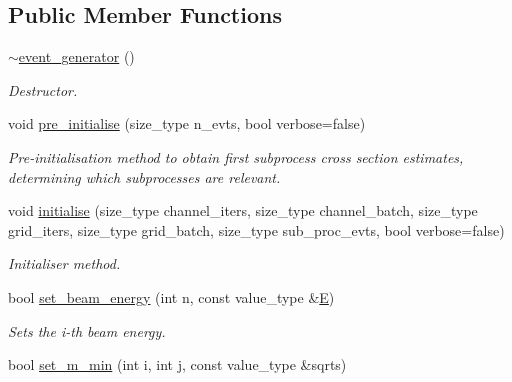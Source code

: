 \subsection*{Public Member Functions}
\begin{DoxyCompactItemize}
\item 
\hypertarget{a00212_a7221639f3475700f6558a9d553756635}{}\hyperlink{a00212_a7221639f3475700f6558a9d553756635}{$\sim$event\+\_\+generator} ()\label{a00212_a7221639f3475700f6558a9d553756635}

\begin{DoxyCompactList}\small\item\em Destructor. \end{DoxyCompactList}\item 
void \hyperlink{a00212_abdbb6535ed37872f82531bb1495c3d75}{pre\+\_\+initialise} (size\+\_\+type n\+\_\+evts, bool verbose=false)
\begin{DoxyCompactList}\small\item\em Pre-\/initialisation method to obtain first subprocess cross section estimates, determining which subprocesses are relevant. \end{DoxyCompactList}\item 
\hypertarget{a00212_ada359dc0810004730e2d679b3eabfd40}{}void \hyperlink{a00212_ada359dc0810004730e2d679b3eabfd40}{initialise} (size\+\_\+type channel\+\_\+iters, size\+\_\+type channel\+\_\+batch, size\+\_\+type grid\+\_\+iters, size\+\_\+type grid\+\_\+batch, size\+\_\+type sub\+\_\+proc\+\_\+evts, bool verbose=false)\label{a00212_ada359dc0810004730e2d679b3eabfd40}

\begin{DoxyCompactList}\small\item\em Initialiser method. \end{DoxyCompactList}\item 
\hypertarget{a00212_a78129d29e1764f9b0c9f3c8d4984cca4}{}bool \hyperlink{a00212_a78129d29e1764f9b0c9f3c8d4984cca4}{set\+\_\+beam\+\_\+energy} (int n, const value\+\_\+type \&\hyperlink{a00451_a8a2e0cd9b961dcfa2eb1ac7426cf3f5f}{E})\label{a00212_a78129d29e1764f9b0c9f3c8d4984cca4}

\begin{DoxyCompactList}\small\item\em Sets the i-\/th beam energy. \end{DoxyCompactList}\item 
\hypertarget{a00212_a0f8223d6906129931762662e2cd94bab}{}bool \hyperlink{a00212_a0f8223d6906129931762662e2cd94bab}{set\+\_\+m\+\_\+min} (int i, int j, const value\+\_\+type \&sqrts)\label{a00212_a0f8223d6906129931762662e2cd94bab}


\end{DoxyCompactItemize}
